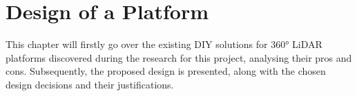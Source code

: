 \chapter{Design of a Platform}
This chapter will firstly go over the existing DIY solutions for 360° LiDAR platforms discovered during the research for this project, analysing their pros and cons.
Subsequently, the proposed design is presented, along with the chosen design decisions and their justifications.




